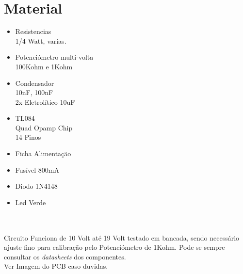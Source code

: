 \documentclass[titlepage, a4paper, 10pt, reqno, openany]{report}
\begin{document}
\section{Material}
\begin{minipage}[t]{.4\linewidth}
	\begin{itemize}
		\setlength\itemsep{-0.5em}
		\item Resistencias \\
		1/4 Watt, varias.
		\item Potenciómetro multi-volta \\
		100Kohm e 1Kohm
		\item Condensador \\
		10nF, 100nF  \\
		2x Eletrolítico 10uF
		
	\end{itemize}
\end{minipage}
\begin{minipage}[t]{.31\linewidth}
	\begin{itemize}
		\setlength\itemsep{-0.5em}
		\item TL084 \\
		Quad Opamp Chip \\
		14 Pinos
		\item Ficha Alimentação
		\item Fusível 800mA
		\item Diodo 1N4148
		\item Led Verde \\
	\end{itemize}
\end{minipage}\\
\\
Circuito Funciona de 10 Volt até 19 Volt testado em bancada, sendo necessário ajuste fino para calibração pelo Potenciómetro de  1Kohm. 
Pode se sempre consultar os {\it datasheets} dos componentes.\\

Ver Imagem do PCB caso duvidas. \\
\end{document}
